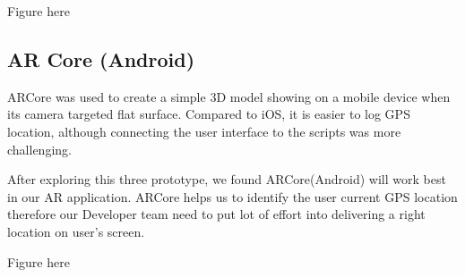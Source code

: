Figure here


\subsection*{AR Core (Android)}
ARCore was used to create a simple 3D model showing on a mobile device when its camera targeted flat surface. Compared to iOS, it is easier to log GPS location, although connecting the user interface to the scripts was more challenging.

After exploring this three prototype, we found ARCore(Android) will work best in our AR application. ARCore helps us to identify the user current GPS location therefore our Developer team need to put lot of effort into delivering a right location on user’s screen.

Figure here


